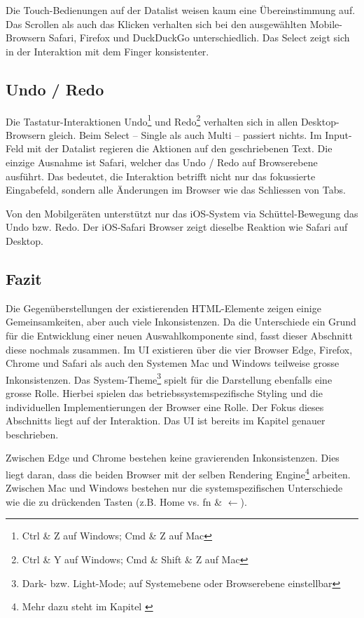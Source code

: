 Die Touch-Bedienungen auf der Datalist weisen kaum eine Übereinstimmung auf. 
Das Scrollen als auch das Klicken verhalten sich bei den ausgewählten Mobile-Browsern Safari, Firefox und DuckDuckGo unterschiedlich. 
Das Select zeigt sich in der Interaktion mit dem Finger konsistenter. 


\subsection{Undo / Redo}
\label{sec:undoRedo}

Die Tastatur-Interaktionen Undo\footnote{
    Ctrl \& Z auf Windows; Cmd \& Z auf Mac
} und Redo\footnote{
    Ctrl \& Y auf Windows; Cmd \& Shift \& Z auf Mac
} verhalten sich in allen Desktop-Browsern gleich. 
Beim Select – Single als auch Multi – passiert nichts. 
Im Input-Feld mit der Datalist regieren die Aktionen auf den geschriebenen Text. 
Die einzige Ausnahme ist Safari, welcher das Undo / Redo auf Browserebene ausführt. 
Das bedeutet, die Interaktion betrifft nicht nur das fokussierte Eingabefeld, sondern alle Änderungen im Browser wie das Schliessen von Tabs. 

Von den Mobilgeräten unterstützt nur das iOS-System via Schüttel-Bewegung das Undo bzw. Redo. 
Der iOS-Safari Browser zeigt dieselbe Reaktion wie Safari auf Desktop. 


\clearpage
\subsection{Fazit}
\label{sec:summeryExisting}

Die Gegenüberstellungen der existierenden HTML-Elemente zeigen einige Gemeinsamkeiten, aber auch viele Inkonsistenzen. 
Da die Unterschiede ein Grund für die Entwicklung einer neuen Auswahlkomponente sind, fasst dieser Abschnitt diese nochmals zusammen. 
Im UI existieren über die vier Browser Edge, Firefox, Chrome und Safari als auch den Systemen Mac und Windows teilweise grosse Inkonsistenzen. 
Das System-Theme\footnote{
    Dark- bzw. Light-Mode; auf Systemebene oder Browserebene einstellbar
} spielt für die Darstellung ebenfalls eine grosse Rolle. 
Hierbei spielen das betriebssystemspezifische Styling und die individuellen Implementierungen der Browser eine Rolle. 
Der Fokus dieses Abschnitts liegt auf der Interaktion. 
Das UI ist bereits im Kapitel \textbf{} genauer beschrieben. 

Zwischen Edge und Chrome bestehen keine gravierenden Inkonsistenzen. 
Dies liegt daran, dass die beiden Browser mit der selben Rendering Engine\footnote{
    Mehr dazu steht im Kapitel \textbf{}
} arbeiten. 
Zwischen Mac und Windows bestehen nur die systemspezifischen Unterschiede wie die zu drückenden Tasten (z.B. Home vs. fn \& $\leftarrow$). 

